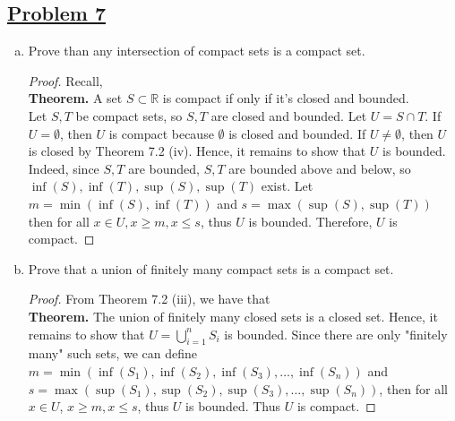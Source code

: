 \documentclass[10pt,letterpaper]{article}
\begin{document}
	\subsection*{{\color{purple}\underline{Problem 7}}}
	\begin{enumerate}[(a)]
	\item Prove than any intersection of compact sets is a compact set.
	\begin{proof}
		Recall, \\
		\textbf{Theorem. }
		A set $S \subset \mathbb{R}$ is compact if only if it's closed and bounded. \\
		
		Let $S, T$ be compact sets, so $S, T$ are closed and bounded. Let $U = S \cap T$.
		If $U = \emptyset$, then $U$ is compact because $\emptyset$ is closed and bounded.
		If $U \neq \emptyset$, then $U$ is closed by Theorem 7.2 (iv). Hence, it remains to show that $U$ is bounded.
		Indeed, since $S, T$ are bounded, $S, T$ are bounded above and below, so 
		$\inf(S), \inf(T), \sup(S), \sup(T)$ exist. Let $m = \min(\inf(S), \inf(T))$ and 
		$s = \max(\sup(S), \sup(T))$ then for all $x \in U, x \geq m, x \leq s$, thus $U$ is bounded.
		Therefore, $U$ is compact.			
	\end{proof}
	
	\item Prove that a union of finitely many compact sets is a compact set.	
	\begin{proof}
		From Theorem 7.2 (iii), we have that \\
		\textbf{Theorem. } The union of finitely many closed sets is a closed set. 
		Hence, it remains to show that
		$U = \displaystyle\bigcup_{i=1}^{n} S_i$ is bounded. 
		Since there are only "finitely many" such sets, we can define
		$m = \min(\inf(S_1), \inf(S_2), \inf(S_3), \ldots, \inf(S_n))$ and 
		$s = \max(\sup(S_1), \sup(S_2), \sup(S_3), \ldots, \sup(S_n))$, then for all 
		$x \in U$, $x \geq m, x \leq s$, thus $U$ is bounded. Thus $U$ is compact.
	\end{proof}
	
	
	\end{enumerate}
	
\end{document}
